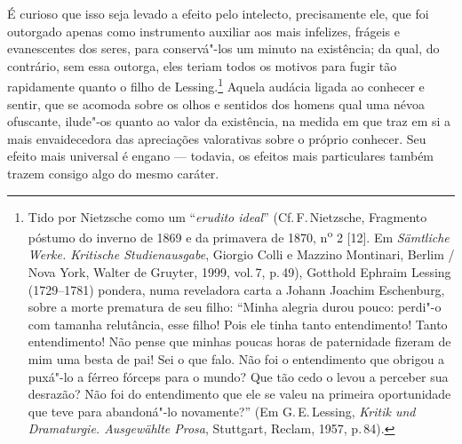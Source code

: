 É curioso que isso seja levado a efeito pelo intelecto, precisamente
ele, que foi outorgado apenas como instrumento auxiliar aos mais
infelizes, frágeis e evanescentes dos seres, para conservá"-los um
minuto na existência; da qual, do contrário, sem essa outorga, eles
teriam todos os motivos para fugir tão rapidamente quanto o filho de
Lessing.\footnote{ Tido por Nietzsche como um “\textit{erudito ideal}”
(Cf.\,F.\,Nietzsche, Fragmento póstumo do inverno de 1869 e da primavera
de 1870, n\textsuperscript{o} 2 [12]. Em \textit{Sämtliche Werke. Kritische
Studienausgabe}, Giorgio Colli e Mazzino Montinari, Berlim / Nova
York, Walter de Gruyter, 1999, vol.\,7, p.\,49), Gotthold Ephraim Lessing
(1729--1781) pondera, numa reveladora carta a Johann Joachim
Eschenburg, sobre a morte prematura de seu filho: “Minha alegria durou
pouco: perdi"-o com tamanha relutância, esse filho! Pois ele tinha
tanto entendimento! Tanto entendimento! Não pense que minhas poucas
horas de paternidade fizeram de mim uma besta de pai! Sei o que falo.
Não foi o entendimento que obrigou a puxá"-lo a férreo fórceps
para o mundo? Que tão cedo o levou a perceber sua desrazão? Não foi do
entendimento que ele se valeu na primeira oportunidade que teve para
abandoná"-lo novamente?” (Em G.\,E.\,Lessing, \textit{Kritik und
Dramaturgie. Ausgewählte Prosa}, Stuttgart, Reclam, 1957, p.\,84).}
Aquela audácia ligada ao conhecer e sentir, que se acomoda sobre os
olhos e sentidos dos homens qual uma névoa ofuscante, ilude"-os quanto
ao valor da existência, na medida em que traz em si a mais
envaidecedora das apreciações valorativas sobre o próprio conhecer. Seu
efeito mais universal é engano --- todavia, os efeitos mais particulares
também trazem consigo algo do mesmo caráter.

